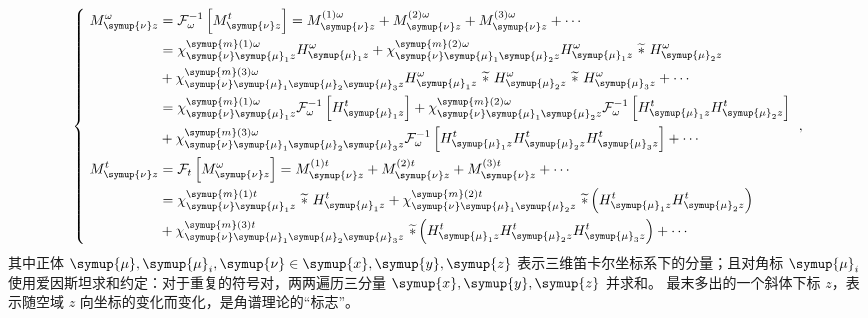 \begin{equation} \label{eq:2-2}
	\left\{\ \begin{aligned} M^\omega_{{\symup{\nu}} z} &= \mathcal F^{-1}_\omega \left[ M^t_{{\symup{\nu}} z} \right] = M^{(1)\omega}_{{\symup{\nu}} z} + M^{(2)\omega}_{{\symup{\nu}} z} + M^{(3)\omega}_{{\symup{\nu}} z} + \cdots \\ &= \chi^{{\symup{m}}(1)\omega}_{{\symup{\nu}} {\symup{\mu}}_1z} H^\omega_{{\symup{\mu}}_1 z} + \chi^{{\symup{m}}(2)\omega}_{{\symup{\nu}} {\symup{\mu}}_1 {\symup{\mu}}_2z} H^\omega_{{\symup{\mu}}_1 z}\ \widetilde *\ H^\omega_{{\symup{\mu}}_2 z} \\ &+ \chi^{{\symup{m}}(3)\omega}_{{\symup{\nu}} {\symup{\mu}}_1 {\symup{\mu}}_2 {\symup{\mu}}_3z} H^\omega_{{\symup{\mu}}_1 z}\ \widetilde *\ H^\omega_{{\symup{\mu}}_2 z}\ \widetilde *\ H^\omega_{{\symup{\mu}}_3 z} + \cdots \\ &= \chi^{{\symup{m}}(1)\omega}_{{\symup{\nu}} {\symup{\mu}}_1z} \mathcal F^{-1}_\omega \left[ H^t_{{\symup{\mu}}_1 z} \right] + \chi^{{\symup{m}}(2)\omega}_{{\symup{\nu}} {\symup{\mu}}_1 {\symup{\mu}}_2z} \mathcal F^{-1}_\omega \left[ H^t_{{\symup{\mu}}_1 z} H^t_{{\symup{\mu}}_2 z} \right] \\ &+ \chi^{{\symup{m}}(3)\omega}_{{\symup{\nu}} {\symup{\mu}}_1 {\symup{\mu}}_2 {\symup{\mu}}_3z} \mathcal F^{-1}_\omega \left[ H^t_{{\symup{\mu}}_1 z} H^t_{{\symup{\mu}}_2 z} H^t_{{\symup{\mu}}_3 z} \right] + \cdots \\ M^t_{{\symup{\nu}} z} &= \mathcal F_t \left[ M^\omega_{{\symup{\nu}} z} \right] = M^{(1)t}_{{\symup{\nu}} z} + M^{(2)t}_{{\symup{\nu}} z} + M^{(3)t}_{{\symup{\nu}} z} + \cdots \\ &= \chi^{{\symup{m}}(1)t}_{{\symup{\nu}} {\symup{\mu}}_1z}\ \widetilde *\ H^t_{{\symup{\mu}}_1 z} + \chi^{{\symup{m}}(2)t}_{{\symup{\nu}} {\symup{\mu}}_1 {\symup{\mu}}_2z}\ \widetilde *\left( H^t_{{\symup{\mu}}_1 z} H^t_{{\symup{\mu}}_2 z} \right) \\ &+ \chi^{{\symup{m}}(3)t}_{{\symup{\nu}} {\symup{\mu}}_1 {\symup{\mu}}_2 {\symup{\mu}}_3z}\ \widetilde *\left( H^t_{{\symup{\mu}}_1 z} H^t_{{\symup{\mu}}_2 z} H^t_{{\symup{\mu}}_3 z} \right) + \cdots  \end{aligned}\right. ~,
\end{equation}
其中正体 ${\symup{\mu}},{\symup{\mu}}_i,{\symup{\nu}} \in {\symup{x}},{\symup{y}},{\symup{z}}$ 表示三维笛卡尔坐标系下的分量；且对角标 ${\symup{\mu}}_i$ 使用爱因斯坦求和约定：对于重复的符号对，两两遍历三分量 ${\symup{x}},{\symup{y}},{\symup{z}}$ 并求和。
最末多出的一个斜体下标 $z$，表示随空域 $z$ 向坐标的变化而变化，是角谱理论的“标志”。

